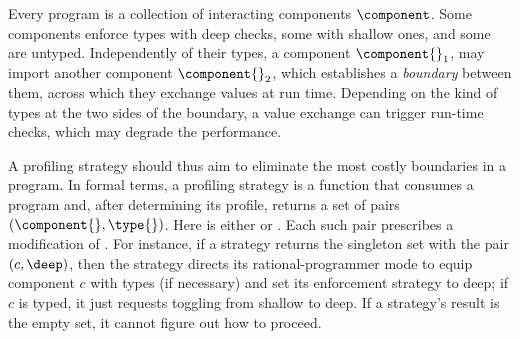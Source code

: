 Every program \program{} is a collection of interacting components $\component$.
Some components enforce types with deep checks, some with shallow ones, and some
are untyped. Independently of their types, a component $\component{}_1$, may
import another component $\component{}_2$, which establishes a \emph{boundary}
between them, across which they exchange values at run time. Depending on the
kind of types at the two sides of the boundary, a value exchange can trigger
run-time checks, which may degrade the performance.

A profiling strategy should thus aim to eliminate the most costly boundaries in
a program. In formal terms, a profiling strategy is a function that consumes a
program \program{} and, after determining its profile, returns a set of pairs
$(\component{}, \type{})$. Here \type{} is either \deep{} or \shallow{}. Each
such pair prescribes a modification of \program{}. For instance, if a strategy
returns the singleton set with the pair $(c, \deep)$, then the strategy directs
its rational-programmer mode to equip component $c$ with types (if necessary)
and set its enforcement strategy to deep; if $c$ is typed, it just requests
toggling from shallow to deep.  If a strategy's result is the empty set, it
cannot figure out how to proceed.


\def\with{with {\em total\/} in place of {\em self\/}}

